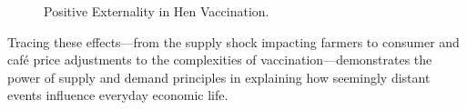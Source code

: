 \documentclass[12pt]{article}
\begin{document}
\begin{doublespace}
\begin{figure}[H]
    \caption{Positive Externality in Hen Vaccination.}
    \label{fig:externality_positive}
  \end{figure}

  Tracing these effects—from the supply shock impacting farmers to consumer and café price adjustments to the complexities of vaccination—demonstrates the power of supply and demand principles in explaining how seemingly distant events influence everyday economic life.



\end{doublespace}
\end{document}
